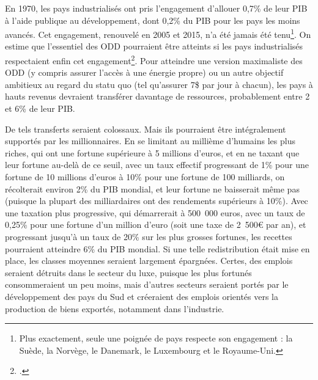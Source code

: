 \documentclass[a5paper,french]{memoir}
\begin{document}
En 1970, les pays industrialisés ont pris l'engagement d'allouer 0,7\% de leur PIB à l'aide publique au développement, dont 0,2\% du PIB pour les pays les moins avancés. Cet engagement, renouvelé en 2005 et 2015, n'a été jamais été tenu\footnote{Plus exactement, seule une poignée de pays respecte son engagement : la Suède, la Norvège, le Danemark, le Luxembourg et le Royaume-Uni.}. %
On estime que l'essentiel des ODD pourraient être atteints si les pays industrialisés respectaient enfin cet engagement\footnote{\citet{sdsn_sdg_2019}.}. Pour atteindre une version maximaliste des ODD (y compris assurer l'accès à une énergie propre) ou un autre objectif ambitieux au regard du statu quo (tel qu'assurer 7\$ par jour à chacun), les pays à hauts revenus devraient transférer davantage de ressources, probablement entre 2 et 6\% de leur PIB. 

De tels transferts seraient colossaux. Mais ils pourraient être intégralement supportés par les millionnaires. En se limitant au millième d'humains les plus riches, qui ont une fortune supérieure à 5 millions d'euros, et en ne taxant que leur fortune au-delà de ce seuil, avec un taux effectif progressant de 1\% pour une fortune de 10 millions d'euros à 10\% pour une fortune de 100 milliards, on récolterait environ 2\% du PIB mondial, et leur fortune ne baisserait même pas (puisque la plupart des milliardaires ont des rendements supérieurs à 10\%). %
Avec une taxation plus progressive, qui démarrerait à 500~000 euros, avec un taux de 0,25\% pour une fortune d'un million d'euro (soit une taxe de 2~500\euro{} par an), et progressant jusqu'à un taux de 20\% sur les plus grosses fortunes, les recettes pourraient atteindre 6\% du PIB mondial. Si une telle redistribution était mise en place, les classes moyennes seraient largement épargnées. Certes, des emplois seraient détruits dans le secteur du luxe, puisque les plus fortunés consommeraient un peu moins, mais d'autres secteurs seraient portés par le développement des pays du Sud et créeraient des emplois orientés vers la production de biens exportés, notamment dans l'industrie. 
\end{document}
